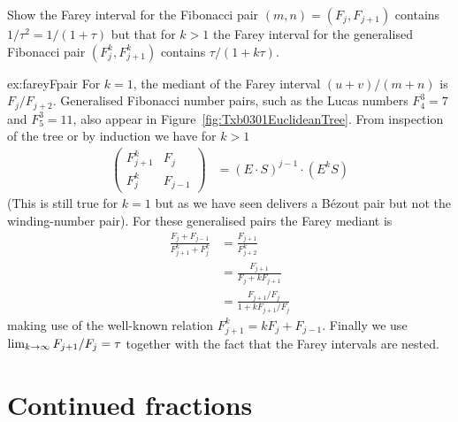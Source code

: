 \begin{jExercise}\label{ex:fareyFpair}
	Show  the Farey interval for the Fibonacci pair $(m,n)= (F_j,F_{j+1})$ contains $1/\tau^2=1/(1+\tau)$ but that for $k>1$ the Farey interval for the generalised Fibonacci pair $(F^k_j,F^k_{j+1})$ contains $\tau/(1+ k \tau)$.
\end{jExercise}
\begin{jAnswer}{ex:fareyFpair}  
For  $k=1$, the mediant of the Farey interval $(u+v)/(m+n)$ is $F_j/F_{j+2}$. 
Generalised Fibonacci number pairs, such as the Lucas numbers $F^3_4=7$ and $F^3_5=11$, also appear in Figure~\ref{fig:Txb0301EuclideanTree}. From inspection of the tree or by induction we have for $k>1$
\begin{align}
	\begin{pmatrix} 
		F^k_{j+1} & F_j 
		\\
		F^k_j & F_{j-1}
	\end{pmatrix} &= 	(E\cdot  S)^{j-1} \cdot  (E^k S) 
	\label{eq:GeneralizedFibonacciMatrix}
\end{align}
(This is still true for $k=1$ but as we have seen delivers a B\'ezout pair but not the winding-number pair). For these generalised pairs the Farey mediant is 
\begin{align}
	\frac{	 F_j + F_{j-1}}{F^k_{j+1}+F^k_{j}}&=	\frac{	 F_{j+1}}{F^k_{j+2}}
\\
	&= 	\frac{	 F_{j+1}}{F_{j} + k F_{j+1}}
		\\&= \frac{ F_{j+1}/F_{j}}{1+ k F_{j+1}/F_{j}}
\end{align}	
making use of the well-known relation $	F^k_{j+1} =   k F_j+ F_{j-1}$. Finally we use $\lim_{ k\rightarrow \infty}  F_{j+1}/F_{j}=\tau$ together with the fact that the Farey intervals are nested.

\end{jAnswer}

\section{Continued fractions}

